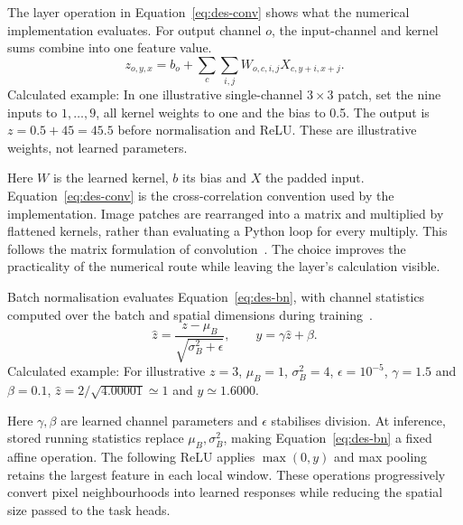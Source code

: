 The layer operation in Equation~\ref{eq:des-conv} shows what the numerical implementation evaluates. For output channel $o$, the input-channel and kernel sums combine into one feature value.
\begin{equation}
z_{o,y,x}=b_o+\sum_c\sum_{i,j}W_{o,c,i,j}X_{c,y+i,x+j}.
\label{eq:des-conv}
\end{equation}
Calculated example: In one illustrative single-channel $3\times3$ patch, set the nine inputs to $1,\ldots,9$, all kernel weights to one and the bias to 0.5. The output is $z=0.5+45=45.5$ before normalisation and ReLU. These are illustrative weights, not learned parameters. \cite[recognise.py, Conv2d]{braunepipeline2026}

Here $W$ is the learned kernel, $b$ its bias and $X$ the padded input. Equation~\ref{eq:des-conv} is the cross-correlation convention used by the implementation. Image patches are rearranged into a matrix and multiplied by flattened kernels, rather than evaluating a Python loop for every multiply. This follows the matrix formulation of convolution~\cite[page to verify]{chellapilla2006}. The choice improves the practicality of the numerical route while leaving the layer's calculation visible.~\cite[recognise.py; train.py; trainlibrary.py]{braunepipeline2026}

Batch normalisation evaluates Equation~\ref{eq:des-bn}, with channel statistics computed over the batch and spatial dimensions during training~\cite[PDF pp.~4--5, Alg.~1]{ioffe2015}.
\begin{equation}
\widehat z=\frac{z-\mu_B}{\sqrt{\sigma_B^2+\epsilon}},\qquad
y=\gamma\widehat z+\beta.
\label{eq:des-bn}
\end{equation}
Calculated example: For illustrative $z=3$, $\mu_B=1$, $\sigma_B^2=4$, $\epsilon=10^{-5}$, $\gamma=1.5$ and $\beta=0.1$, $\widehat z=2/\sqrt{4.00001}\simeq1$ and $y\simeq1.6000$. \cite[recognise.py, BatchNorm2d; train.py, BatchNorm2dForwardTrain]{braunepipeline2026}

Here $\gamma,\beta$ are learned channel parameters and $\epsilon$ stabilises division. At inference, stored running statistics replace $\mu_B,\sigma_B^2$, making Equation~\ref{eq:des-bn} a fixed affine operation. The following ReLU applies $\max(0,y)$ and max pooling retains the largest feature in each local window. These operations progressively convert pixel neighbourhoods into learned responses while reducing the spatial size passed to the task heads.~\cite[recognise.py; train.py; trainlibrary.py]{braunepipeline2026}

